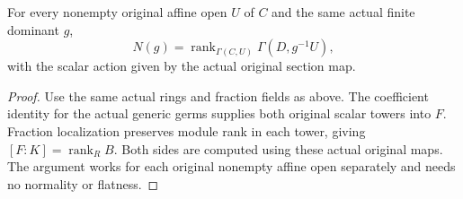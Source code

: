 \begin{theorem}
\label{thm:intrinsic-numerical-function-field-degree-affine-rank}
\leanok
For every nonempty original affine open $U$ of $C$ and the same actual
finite dominant $g$,
\[
 N(g)=\operatorname{rank}_{\Gamma(C,U)}\Gamma(D,g^{-1}U),
\]
with the scalar action given by the actual original section map.
\end{theorem}
\begin{proof}
Use the same actual rings and fraction fields as above. The coefficient
identity for the actual generic germs supplies both original scalar
towers into $F$. Fraction localization preserves module rank in each
tower, giving
$[F:K]=\operatorname{rank}_R B$. Both sides are computed using these
actual original maps. The argument works for each original nonempty
affine open separately and needs no normality or flatness.
\end{proof}

